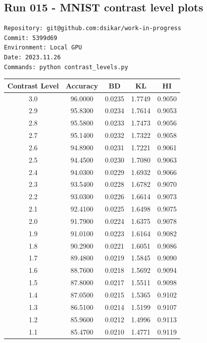 \subsection{Run 015 - MNIST contrast level plots}
\label{app_res:015}
\begin{verbatim}
Repository: git@github.com:dsikar/work-in-progress
Commit: 5399d69
Environment: Local GPU
Date: 2023.11.26
Commands: python contrast_levels.py
\end{verbatim}

\begin{table}[ht]
\centering
\begin{tabular}{|c|c|c|c|c|}
\hline
Contrast Level & Accuracy & BD & KL & HI \\
\hline
3.0 & 96.0000 & 0.0235 & 1.7749 & 0.9050 \\
2.9 & 95.8300 & 0.0234 & 1.7614 & 0.9053 \\
2.8 & 95.5800 & 0.0233 & 1.7473 & 0.9056 \\
2.7 & 95.1400 & 0.0232 & 1.7322 & 0.9058 \\
2.6 & 94.8900 & 0.0231 & 1.7221 & 0.9061 \\
2.5 & 94.4500 & 0.0230 & 1.7080 & 0.9063 \\
2.4 & 94.0300 & 0.0229 & 1.6932 & 0.9066 \\
2.3 & 93.5400 & 0.0228 & 1.6782 & 0.9070 \\
2.2 & 93.0300 & 0.0226 & 1.6614 & 0.9073 \\
2.1 & 92.4100 & 0.0225 & 1.6498 & 0.9075 \\
2.0 & 91.7900 & 0.0224 & 1.6375 & 0.9078 \\
1.9 & 91.0100 & 0.0223 & 1.6164 & 0.9082 \\
1.8 & 90.2900 & 0.0221 & 1.6051 & 0.9086 \\
1.7 & 89.4800 & 0.0219 & 1.5845 & 0.9090 \\
1.6 & 88.7600 & 0.0218 & 1.5692 & 0.9094 \\
1.5 & 87.8000 & 0.0217 & 1.5511 & 0.9098 \\
1.4 & 87.0500 & 0.0215 & 1.5365 & 0.9102 \\
1.3 & 86.5100 & 0.0214 & 1.5199 & 0.9107 \\
1.2 & 85.9600 & 0.0212 & 1.4996 & 0.9113 \\
1.1 & 85.4700 & 0.0210 & 1.4771 & 0.9119 \\

\end{tabular}
\end{table}
